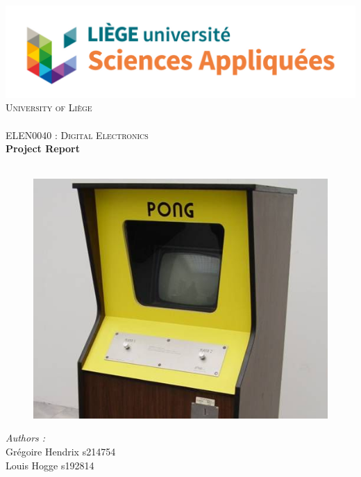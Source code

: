\begin{titlepage}

\begin{center}
\includegraphics[scale = 0.35]{logo.jpg}\\
\vspace{1cm}
\textsc{\huge University of Liège}\\[1.2cm]
\HRule \\[1cm]
\textsc{\LARGE ELEN0040 : Digital Electronics }\\[1cm]
{\Huge \bfseries Project Report}\\[1.4cm] 
\HRule \\[1cm]
\end{center}
\begin{figure}[H]
    \centering
    \includegraphics[scale = 0.55]{Ressources/png/pong_image.jpg}
\end{figure}
\begin{minipage}{0.45\linewidth}
      \begin{flushleft} \large
        \emph{Authors : } \\
        Grégoire Hendrix  s214754 \\
        Louis Hogge  s192814 \\

\end{flushleft}
\end{minipage}
\end{titlepage}
